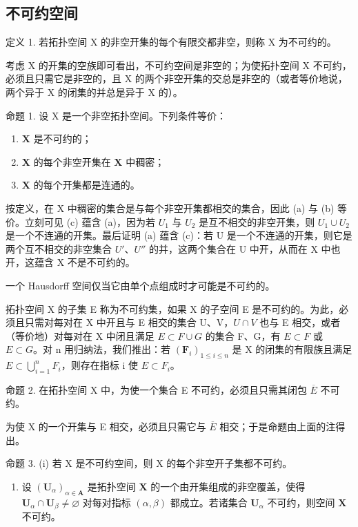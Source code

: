 \subsection{不可约空间}

定义 1. 若拓扑空间 X 的非空开集的每个有限交都非空，则称 X 为不可约的。

考虑 X 的开集的空族即可看出，不可约空间是非空的；为使拓扑空间 X 不可约，必须且只需它是非空的，且 X 的两个非空开集的交总是非空的（或者等价地说，两个异于 X 的闭集的并总是异于 X 的）。

命题 1. 设 X 是一个非空拓扑空间。下列条件等价：

\begin{enumerate}
\def\labelenumi{(\alph{enumi})}
\item
  \(\mathbf{X}\) 是不可约的；
\item
  \(\mathbf{X}\) 的每个非空开集在 \(\mathbf{X}\) 中稠密；
\item
  \(\mathbf{X}\) 的每个开集都是连通的。
\end{enumerate}

按定义，在 X 中稠密的集合是与每个非空开集都相交的集合，因此 (a) 与 (b) 等价。立刻可见 (c) 蕴含 (a)，因为若 \(U_{1}\) 与 \(U_{2}\) 是互不相交的非空开集，则 \(U_{1} \cup U_{2}\) 是一个不连通的开集。最后证明 (a) 蕴含 (c)：若 U 是一个不连通的开集，则它是两个互不相交的非空集合 \(U'\)、\(U''\) 的并，这两个集合在 U 中开，从而在 X 中也开，这蕴含 X 不是不可约的。

一个 Hausdorff 空间仅当它由单个点组成时才可能是不可约的。

拓扑空间 X 的子集 E 称为不可约集，如果 X 的子空间 E 是不可约的。为此，必须且只需对每对在 X 中开且与 E 相交的集合 U、V，\(U \cap V\) 也与 E 相交，或者（等价地）对每对在 X 中闭且满足 \(E \subset F \cup G\) 的集合 F、G，有 \(E \subset F\) 或 \(E \subset G\)。对 n 用归纳法，我们推出：若 \((\mathbf{F}_{i})_{1 \leq i \leq n}\) 是 X 的闭集的有限族且满足 \(E \subset \bigcup_{i=1}^{n} F_{i}\)，则存在指标 i 使 \(E \subset F_{i}\)。

命题 2. 在拓扑空间 X 中，为使一个集合 E 不可约，必须且只需其闭包 \(\overline{E}\) 不可约。

为使 X 的一个开集与 E 相交，必须且只需它与 \(\overline{E}\) 相交；于是命题由上面的注得出。

命题 3. (i) 若 X 是不可约空间，则 X 的每个非空开子集都不可约。

\begin{enumerate}
\def\labelenumi{(\roman{enumi})}
\setcounter{enumi}{1}
\item
  设 \((\mathbf{U}_{\alpha})_{\alpha \in \mathbf{A}}\) 是拓扑空间 \(\mathbf{X}\) 的一个由开集组成的非空覆盖，使得 \(\mathbf{U}_{\alpha} \cap \mathbf{U}_{\beta} \neq \varnothing\) 对每对指标 \((\alpha, \beta)\) 都成立。若诸集合 \(\mathbf{U}_{\alpha}\) 不可约，则空间 \(\mathbf{X}\) 不可约。
\end{enumerate}

